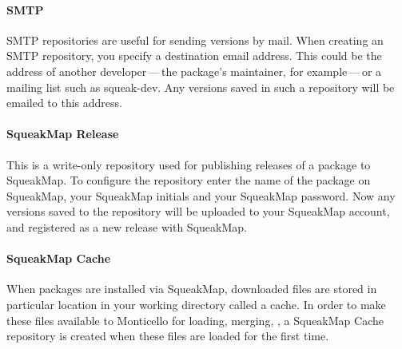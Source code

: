 \documentclass[a4paper,10pt,twoside]{book}
\begin{document}
\paragraph{SMTP} SMTP repositories are useful for sending versions by mail. When creating an SMTP repository, you specify a destination email address. This could be the address of another developer\,---\,the package's maintainer, for example\,---\,or a mailing list such as squeak-dev. Any versions saved in such a repository will be emailed to this address.   

\paragraph{SqueakMap Release} This is a write-only repository used for publishing releases of a package to SqueakMap. To configure the repository enter the name of the package on SqueakMap, your SqueakMap initials and your SqueakMap password. Now any versions saved to the repository will be uploaded to your SqueakMap account, and registered as a new release with SqueakMap.  

\paragraph{SqueakMap Cache} When packages are installed via SqueakMap, downloaded files are stored in particular location  in your working directory called a cache. In order to make these files available to Monticello for loading, merging, \etc, a SqueakMap Cache repository is created when these files are loaded for the first time.



\end{document}
